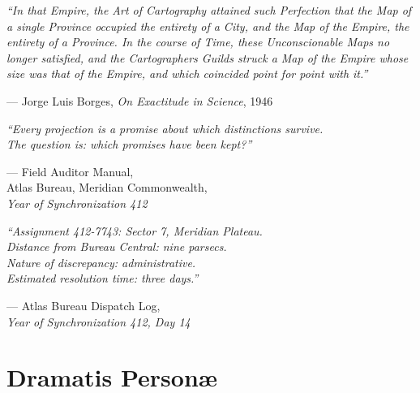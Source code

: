 \documentclass[11pt, letterpaper]{article}
\begin{document}
\begin{center}
\begin{minipage}{0.6\textwidth}
\itshape
``In that Empire, the Art of Cartography attained such Perfection that the Map
of a single Province occupied the entirety of a City, and the Map of the Empire,
the entirety of a Province. In the course of Time, these Unconscionable Maps no
longer satisfied, and the Cartographers Guilds struck a Map of the Empire whose
size was that of the Empire, and which coincided point for point with it.''

\vspace{0.6em}
\raggedleft --- Jorge Luis Borges,
\textit{On Exactitude in Science}, 1946

\vspace{1.8em}

\itshape
``Every projection is a promise about which distinctions survive.\\
The question is: which promises have been kept?''

\vspace{0.6em}
\raggedleft --- Field Auditor Manual,\\
Atlas Bureau, Meridian Commonwealth,\\
\textit{Year of Synchronization 412}

\vspace{1.8em}

\itshape
``Assignment 412-7743: Sector 7, Meridian Plateau.\\
Distance from Bureau Central: nine parsecs.\\
Nature of discrepancy: administrative.\\
Estimated resolution time: three days.''

\vspace{0.6em}
\raggedleft --- Atlas Bureau Dispatch Log,\\
\textit{Year of Synchronization 412, Day 14}

\end{minipage}
\end{center}

\newpage


\thispagestyle{empty}
\section*{Dramatis Person\ae}

\vspace{0.6em}
\end{document}
